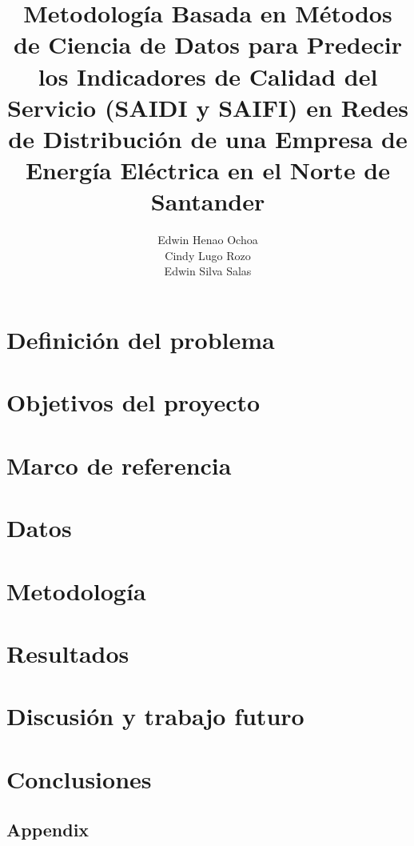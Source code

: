 \documentclass{unipd-thesis-modern} %
\title{Metodología Basada en Métodos de Ciencia de Datos para Predecir los Indicadores de Calidad del Servicio (SAIDI y SAIFI) en Redes de Distribución de una Empresa de Energía Eléctrica en el Norte de Santander}
\author{Edwin Henao Ochoa\\
Cindy Lugo Rozo\\
Edwin Silva Salas}
\begin{document}
\renewcommand{\tablename}{Tabla}
\renewcommand{\listfigurename}{Lista de figuras}
\renewcommand{\listtablename}{Lista de tablas}
    \frontmatter
    
    \newpage
    \mainmatter
    \chapter{Definición del problema}
    
    \newpage
    
    \chapter{Objetivos del proyecto} %
    
    
    \chapter{Marco de referencia}
    
    
    \chapter{Datos}
        
    \chapter{Metodología}
        
     \chapter{Resultados}
     
    \chapter{Discusión y trabajo futuro}
    
    \chapter{Conclusiones}
    
    \clearpage
    \printbibliography
     \begin{appendices}
    \chapter{Appendix}
        
    \end{appendices}
\end{document}

